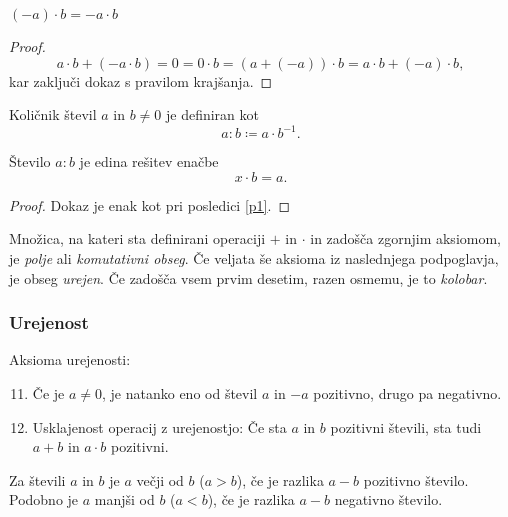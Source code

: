 \documentclass[12pt, a4paper]{article}
\begin{document}
\begin{posledica}
$(-a)\cdot b=-a\cdot b$
\end{posledica}

\begin{proof}
\[
a\cdot b+(-a\cdot b)=0=0\cdot b=(a+(-a))\cdot b=a\cdot b+(-a)\cdot b,
\]
kar zaključi dokaz s pravilom krajšanja.
\end{proof}

\begin{definicija} Količnik števil $a$ in $b\ne 0$ je definiran kot
\[
a:b\coloneqq a\cdot b^{-1}.
\]
\end{definicija}

\begin{posledica}
Število $a:b$ je edina rešitev enačbe
\[
x\cdot b=a.
\]
\end{posledica}

\begin{proof}
Dokaz je enak kot pri posledici \ref{p1}.
\end{proof}

\begin{definicija}
Množica, na kateri sta definirani operaciji $+$ in $\cdot$ in zadošča zgornjim aksiomom, je \emph{polje} ali \emph{komutativni obseg}. Če veljata še aksioma iz naslednjega podpoglavja, je obseg \emph{urejen}. Če zadošča vsem prvim desetim, razen osmemu, je to \emph{kolobar}.
\end{definicija}

\newpage

\subsubsection{Urejenost}

\begin{okvir}
\begin{definicija}
Aksioma urejenosti:

\begin{enumerate}[label=A\arabic*:]
\setcounter{enumi}{10}
\item Če je $a\ne 0$, je natanko eno od števil $a$ in $-a$ pozitivno, drugo pa negativno.
\item Usklajenost operacij z urejenostjo: Če sta $a$ in $b$ pozitivni števili, sta tudi $a+b$ in $a\cdot b$ pozitivni.
\end{enumerate}
\end{definicija}
\end{okvir}

\begin{definicija}
Za števili $a$ in $b$ je $a$ večji od $b$ ($a>b$), če je razlika $a-b$ pozitivno število. Podobno je $a$ manjši od $b$ ($a<b$), če je razlika $a-b$ negativno število.
\end{definicija}
\end{document}
